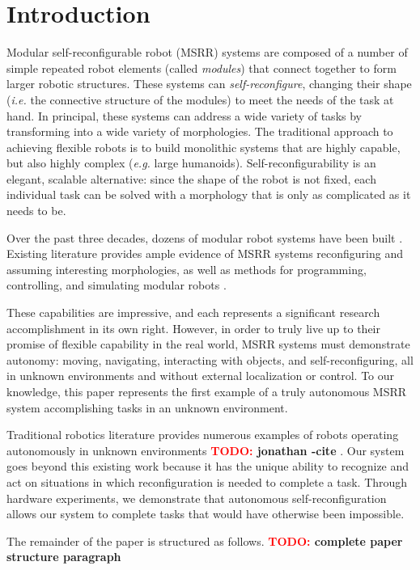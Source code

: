 \documentclass[conference]{IEEEtran}
\newcommand{\TODO}[1]{ {\bf \textcolor{red}{TODO:} #1 }}
\begin{document}
\section{Introduction} \label{sec:introduction}

Modular self-reconfigurable robot (MSRR) systems are composed of a number of simple repeated robot elements (called \emph{modules}) that connect together to form larger robotic structures. These systems can \emph{self-reconfigure}, changing their shape (\emph{i.e.} the connective structure of the modules) to meet the needs of the task at hand.
In principal, these systems can address a wide variety of tasks by transforming into a wide variety of morphologies. The traditional approach to achieving flexible robots is to build  monolithic systems that are highly capable, but also highly complex (\emph{e.g.} large humanoids).  Self-reconfigurability is an elegant, scalable alternative: since the shape of the robot is not fixed, each individual task can be solved with a morphology that is only as complicated as it needs to be.  

Over the past three decades, dozens of modular robot systems have been built \cite{Yim2007a}. Existing literature provides ample evidence of MSRR systems reconfiguring and assuming interesting morphologies, as well as methods for programming, controlling, and simulating modular robots \cite{Yim2007,Jing2016,Yim1994}. 

These capabilities are impressive, and each represents a significant research accomplishment in its own right. However, in order to truly live up to their promise of flexible capability in the real world, MSRR systems must demonstrate autonomy: moving, navigating, interacting with objects, and self-reconfiguring, all in unknown environments and without external localization or control. To our knowledge, this paper represents the first example of a truly autonomous MSRR system accomplishing tasks in an unknown environment.

Traditional robotics literature provides numerous examples of robots operating autonomously in unknown environments \TODO{jonathan -cite}. Our system goes beyond this existing work because it has the unique ability to recognize and act on situations in which reconfiguration is needed to complete a task.
Through hardware experiments, we demonstrate that autonomous self-reconfiguration allows our system to complete tasks that would have otherwise been impossible.

The remainder of the paper is structured as follows. \TODO{complete paper structure paragraph}
\end{document}
